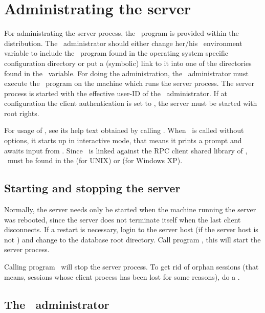 \section{Administrating the server}

For administrating the server process, the \ program
is provided within the distribution. The \plob\ administrator should
either change her/his \ environment variable to include the
\ program found in the operating system specific
configuration directory
 or put a (symbolic) link to it
into one of the directories found in the \ variable. For
doing the administration, the \plob\ administrator must execute the
\ program on the machine which runs the server
process. The server process is started with the effective user-ID of
the \plob\ administrator. If at configuration the client
authentication is set to , the server must be
started with root rights.

For usage of , see its help text obtained by calling
. When \ is called without
options, it starts up in interactive mode, that means it prints a
prompt and awaits input from . Since \ is
linked against the RPC client shared library of \plobwoexcl,
\ must be found in the
 (for UNIX) or  (for
Windows XP).

\subsection{Starting and stopping the server}

Normally, the server needs only be started when the machine running
the server was rebooted, since the server does not terminate itself
when the last client disconnects.  If a restart is necessary, login to
the server host (if the server host is not ) and
change to the database root directory. Call program , this will start the server process.

Calling program \ will stop the server
process. To get rid of orphan sessions (that means, sessions whose
client process has been lost for some reasons), do a .

\subsection[The administrator]{The \protect\plob\ administrator}

